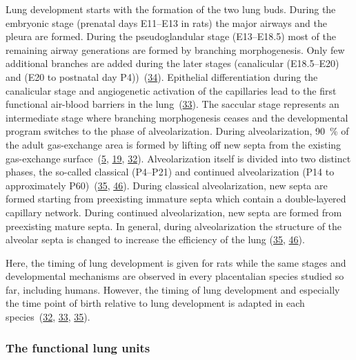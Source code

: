 \documentclass[
  american,
]{article}
\begin{document}
Lung development starts with the formation of the two lung buds.
During the embryonic stage (prenatal days E11--E13 in rats) the major airways and the pleura are formed.
During the pseudoglandular stage (E13--E18.5) most of the remaining airway generations are formed by branching morphogenesis.
Only few additional branches are added during the later stages (canalicular (E18.5--E20) and (E20 to postnatal day P4))~(\protect\hyperlink{ref-TsNwin2E}{34}).
Epithelial differentiation during the canalicular stage and angiogenetic activation of the capillaries lead to the first functional air-blood barriers in the lung~(\protect\hyperlink{ref-ODQCVC23}{33}).
The saccular stage represents an intermediate stage where branching morphogenesis ceases and the developmental program switches to the phase of alveolarization.
During alveolarization, 90~\% of the adult gas-exchange area is formed by lifting off new septa from the existing gas-exchange surface~(\protect\hyperlink{ref-auNiE56G}{5}, \protect\hyperlink{ref-1AhvLCPky}{19}, \protect\hyperlink{ref-XQLPrPTJ}{32}).
Alveolarization itself is divided into two distinct phases, the so-called classical (P4--P21) and continued alveolarization (P14 to approximately P60)~(\protect\hyperlink{ref-d1YV8oOK}{35}, \protect\hyperlink{ref-wnl86DEM}{46}).
During classical alveolarization, new septa are formed starting from preexisting immature septa which contain a double-layered capillary network.
During continued alveolarization, new septa are formed from preexisting mature septa.
In general, during alveolarization the structure of the alveolar septa is changed to increase the efficiency of the lung (\protect\hyperlink{ref-d1YV8oOK}{35}, \protect\hyperlink{ref-wnl86DEM}{46}).

Here, the timing of lung development is given for rats while the same stages and developmental mechanisms are observed in every placentalian species studied so far, including humans.
However, the timing of lung development and especially the time point of birth relative to lung development is adapted in each species~(\protect\hyperlink{ref-XQLPrPTJ}{32}, \protect\hyperlink{ref-ODQCVC23}{33}, \protect\hyperlink{ref-d1YV8oOK}{35}).

\hypertarget{the-functional-lung-units}{%
\subsubsection{The functional lung units}\label{the-functional-lung-units}}
\end{document}
